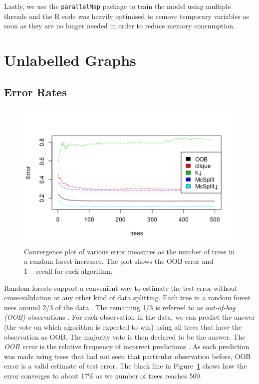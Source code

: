 \documentclass{l4proj}
\theoremstyle{definition}
\theoremstyle{remark}
\begin{document}
Lastly, we use the \texttt{parallelMap} package to train the model using
multiple threads and the R code was heavily optimised to remove temporary
variables as soon as they are no longer needed in order to reduce memory
consumption. 

\section{Unlabelled Graphs}

\subsection{Error Rates} \label{sec:unlabelled_error_rates}

\begin{figure}
  \centering
  \includegraphics[scale=0.5]{images/unlabelled_forest_errors.png}
  \caption{Convergence plot of various error measures as the number of trees in
    a random forest increases. The plot shows the OOB error and $1 -
    \text{recall}$ for each algorithm.}
  \label{fig:unlabelled_forest_errors}
\end{figure}

Random forests support a convenient way to estimate the test error without
cross-validation or any other kind of data splitting. Each tree in a random
forest uses around 2/3 of the data \cite{James:2014:ISL:2517747}. The remaining
1/3 is referred to as \emph{out-of-bag (OOB)} observations . For each
observation in the data, we can predict the answer (the vote on which algorithm
is expected to win) using all trees that have the observation as OOB. The
majority vote is then declared to be the answer. The \emph{OOB error} is
the relative frequency of incorrect predictions \cite{James:2014:ISL:2517747}.
As each prediction was made using trees that had not seen that particular
observation before, OOB error is a valid estimate of test error. The black line
in Figure~\ref{fig:unlabelled_forest_errors} shows how the error converges to
about 17\% as we number of trees reaches 500.
\end{document}
